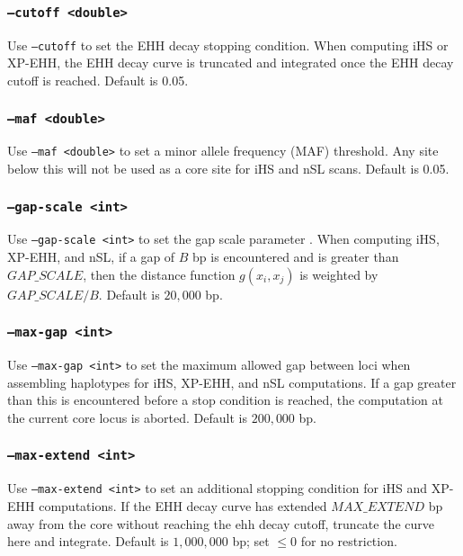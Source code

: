 \documentclass[12pt]{article}%
\begin{document}
\subsubsection{{\tt --cutoff <double>}}

Use {\tt --cutoff} to set the EHH decay stopping condition.  When computing iHS or XP-EHH, the EHH decay curve is truncated and integrated once the EHH decay cutoff is reached.  Default is 0.05.

\subsubsection{{\tt --maf <double>}}

Use {\tt --maf <double>} to set a minor allele frequency (MAF) threshold.  Any site below this will not be used as a core site for iHS and nSL scans.  Default is 0.05.

\subsubsection{{\tt --gap-scale <int>}}

Use {\tt --gap-scale <int>} to set the gap scale parameter \cite[]{VoightEtAl06}.  When computing iHS, XP-EHH, and nSL, if a gap of $B$ bp is encountered and is greater than $GAP\_SCALE$, then the distance function $g(x_i,x_j)$ is weighted by $GAP\_SCALE/B$. Default is $20,000$ bp.

\subsubsection{{\tt --max-gap <int>}}

Use {\tt --max-gap <int>} to set the maximum allowed gap between loci when assembling haplotypes for iHS, XP-EHH, and nSL computations.  If a gap greater than this is encountered before a stop condition is reached, the computation at the current core locus is aborted.  Default is $200,000$ bp.

\subsubsection{{\tt --max-extend <int>}}

Use {\tt --max-extend <int>} to set an additional stopping condition for iHS and XP-EHH computations.  If the EHH decay curve has extended $MAX\_EXTEND$ bp away from the core without reaching the ehh decay cutoff, truncate the curve here and integrate.  Default is $1,000,000$ bp; set $\le 0$ for no restriction.
\end{document}
